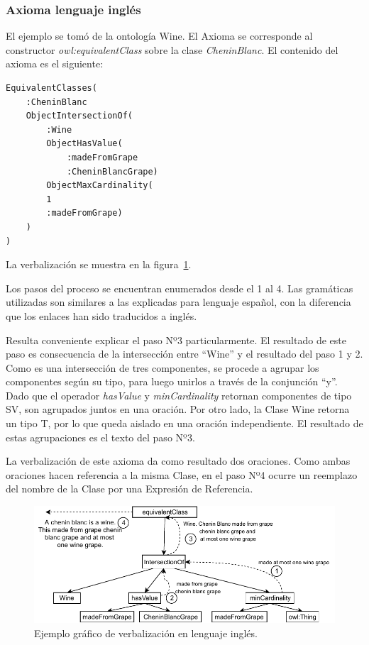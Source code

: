 \subsubsection{Axioma lenguaje inglés}
El ejemplo se tomó de la ontología Wine. El Axioma se corresponde al constructor \emph{owl:equivalentClass} sobre la clase \emph{CheninBlanc}. El contenido del axioma es el siguiente: 

\begin{verbatim}
EquivalentClasses(
    :CheninBlanc
    ObjectIntersectionOf(
        :Wine
        ObjectHasValue(
            :madeFromGrape
            :CheninBlancGrape)
        ObjectMaxCardinality(
        1
        :madeFromGrape)
    )
)
\end{verbatim}
La verbalización se muestra en la figura~\ref{fig:ejemplo_verb_ingles}.

Los pasos del proceso se encuentran enumerados desde el 1 al 4. Las gramáticas utilizadas son similares a las explicadas para lenguaje español, con la diferencia que los enlaces han sido traducidos a inglés.

Resulta conveniente explicar el paso Nº3 particularmente. El resultado de este paso es consecuencia de la intersección entre ``Wine'' y el resultado del paso 1 y 2. 
Como es una intersección de tres componentes, se procede a agrupar los componentes según su tipo, para luego unirlos a través de la conjunción ``y''. Dado que el operador \emph{hasValue} y \emph{minCardinality} retornan componentes de tipo SV, son agrupados juntos en una oración. Por otro lado, la Clase Wine retorna un tipo T, por lo que queda aislado en una oración independiente. El resultado de estas agrupaciones es el texto del paso Nº3.

La verbalización de este axioma da como resultado dos oraciones. Como ambas oraciones hacen referencia a la misma Clase, en el paso Nº4 ocurre un reemplazo del nombre de la Clase por una Expresión de Referencia. 

\begin{figure}
    \centering
    \includegraphics[width=\textwidth]{img/generacion_documento/verbalizacion_equivalentClass_english.pdf}
    \caption{Ejemplo gráfico de verbalización en lenguaje inglés.}
    \label{fig:ejemplo_verb_ingles}
\end{figure}

